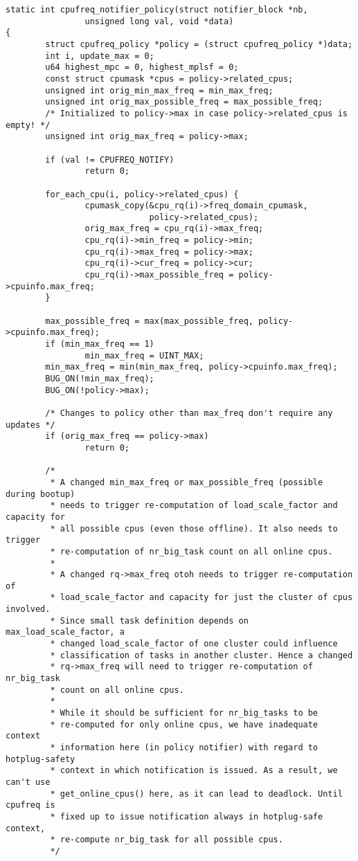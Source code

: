 \documentclass{article}
\begin{document}
\begin{verbatim}
static int cpufreq_notifier_policy(struct notifier_block *nb,
                unsigned long val, void *data)
{
        struct cpufreq_policy *policy = (struct cpufreq_policy *)data;
        int i, update_max = 0;
        u64 highest_mpc = 0, highest_mplsf = 0;
        const struct cpumask *cpus = policy->related_cpus;
        unsigned int orig_min_max_freq = min_max_freq;
        unsigned int orig_max_possible_freq = max_possible_freq;
        /* Initialized to policy->max in case policy->related_cpus is empty! */
        unsigned int orig_max_freq = policy->max;

        if (val != CPUFREQ_NOTIFY)
                return 0;

        for_each_cpu(i, policy->related_cpus) {
                cpumask_copy(&cpu_rq(i)->freq_domain_cpumask,
                             policy->related_cpus);
                orig_max_freq = cpu_rq(i)->max_freq;
                cpu_rq(i)->min_freq = policy->min;
                cpu_rq(i)->max_freq = policy->max;
                cpu_rq(i)->cur_freq = policy->cur;
                cpu_rq(i)->max_possible_freq = policy->cpuinfo.max_freq;
        }

        max_possible_freq = max(max_possible_freq, policy->cpuinfo.max_freq);
        if (min_max_freq == 1)
                min_max_freq = UINT_MAX;
        min_max_freq = min(min_max_freq, policy->cpuinfo.max_freq);
        BUG_ON(!min_max_freq);
        BUG_ON(!policy->max);

        /* Changes to policy other than max_freq don't require any updates */
        if (orig_max_freq == policy->max)
                return 0;

        /*
         * A changed min_max_freq or max_possible_freq (possible during bootup)
         * needs to trigger re-computation of load_scale_factor and capacity for
         * all possible cpus (even those offline). It also needs to trigger
         * re-computation of nr_big_task count on all online cpus.
         *
         * A changed rq->max_freq otoh needs to trigger re-computation of
         * load_scale_factor and capacity for just the cluster of cpus involved.
         * Since small task definition depends on max_load_scale_factor, a
         * changed load_scale_factor of one cluster could influence
         * classification of tasks in another cluster. Hence a changed
         * rq->max_freq will need to trigger re-computation of nr_big_task
         * count on all online cpus.
         *
         * While it should be sufficient for nr_big_tasks to be
         * re-computed for only online cpus, we have inadequate context
         * information here (in policy notifier) with regard to hotplug-safety
         * context in which notification is issued. As a result, we can't use
         * get_online_cpus() here, as it can lead to deadlock. Until cpufreq is
         * fixed up to issue notification always in hotplug-safe context,
         * re-compute nr_big_task for all possible cpus.
         */


\end{verbatim}
\end{document}
